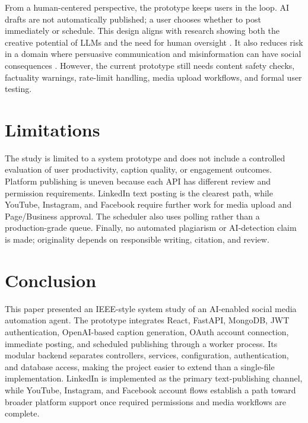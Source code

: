 \documentclass[conference]{IEEEtran}
\begin{document}
From a human-centered perspective, the prototype keeps users in the loop. AI drafts are not automatically published; a user chooses whether to post immediately or schedule. This design aligns with research showing both the creative potential of LLMs and the need for human oversight \cite{hubert2024,mcguire2024}. It also reduces risk in a domain where persuasive communication and misinformation can have social consequences \cite{matz2024,hoes2024,ahmad2024}. However, the current prototype still needs content safety checks, factuality warnings, rate-limit handling, media upload workflows, and formal user testing.

\section{Limitations}
The study is limited to a system prototype and does not include a controlled evaluation of user productivity, caption quality, or engagement outcomes. Platform publishing is uneven because each API has different review and permission requirements. LinkedIn text posting is the clearest path, while YouTube, Instagram, and Facebook require further work for media upload and Page/Business approval. The scheduler also uses polling rather than a production-grade queue. Finally, no automated plagiarism or AI-detection claim is made; originality depends on responsible writing, citation, and review.

\section{Conclusion}
This paper presented an IEEE-style system study of an AI-enabled social media automation agent. The prototype integrates React, FastAPI, MongoDB, JWT authentication, OpenAI-based caption generation, OAuth account connection, immediate posting, and scheduled publishing through a worker process. Its modular backend separates controllers, services, configuration, authentication, and database access, making the project easier to extend than a single-file implementation. LinkedIn is implemented as the primary text-publishing channel, while YouTube, Instagram, and Facebook account flows establish a path toward broader platform support once required permissions and media workflows are complete.
\end{document}
